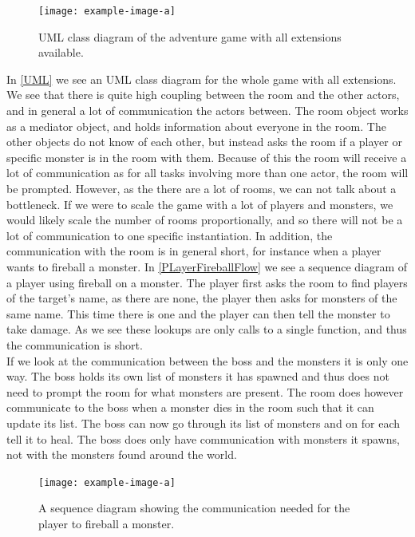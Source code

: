 \begin{figure}
	\centering
	\texttt{[image: example-image-a]}
	\caption{UML class diagram of the adventure game with all extensions available.}
	\label{UML}
\end{figure}
In \autoref{UML} we see an UML class diagram for the whole game with all extensions. We see that there is quite high coupling between the room and the other actors, and in general a lot of communication the actors between. The room object works as a mediator object, and holds information about everyone in the room. The other objects do not know of each other, but instead asks the room if a player or specific monster is in the room with them. Because of this the room will receive a lot of communication as for all tasks involving more than one actor, the room will be prompted. However, as the there are a lot of rooms, we can not talk about a bottleneck. If we were to scale the game with a lot of players and monsters, we would likely scale the number of rooms proportionally, and so there will not be a lot of communication to one specific instantiation. In addition, the communication with the room is in general short, for instance when a player wants to fireball a monster. In \autoref{PLayerFireballFlow} we see a sequence diagram of a player using fireball on a monster. The player first asks the room to find players of the target's name, as there are none, the player then asks for monsters of the same name. This time there is one and the player can then tell the monster to take damage. As we see these lookups are only calls to a single function, and thus the communication is short.\\
If we look at the communication between the boss and the monsters it is only one way. The boss holds its own list of monsters it has spawned and thus does not need to prompt the room for what monsters are present. The room does however communicate to the boss when a monster dies in the room such that it can update its list. The boss can now go through its list of monsters and on for each tell it to heal. The boss does only have communication with monsters it spawns, not with the monsters found around the world.\\

\begin{figure}
	\centering
	\texttt{[image: example-image-a]}
	\caption{A sequence diagram showing the communication needed for the player to fireball a monster.}
	\label{PLayerFireballFlow}
\end{figure}

